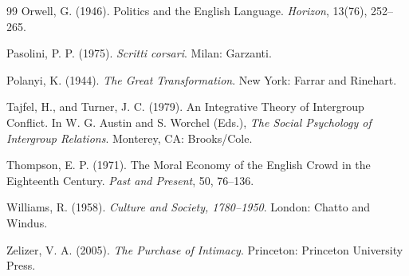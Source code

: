 \documentclass[12pt]{article}
\begin{document}
\begin{thebibliography}{99}
Orwell, G. (1946).
\newblock Politics and the English Language.
\newblock \emph{Horizon}, 13(76), 252--265.

Pasolini, P. P. (1975).
\newblock \emph{Scritti corsari}.
\newblock Milan: Garzanti.

Polanyi, K. (1944).
\newblock \emph{The Great Transformation}.
\newblock New York: Farrar and Rinehart.

Tajfel, H., and Turner, J. C. (1979).
\newblock An Integrative Theory of Intergroup Conflict.
\newblock In W. G. Austin and S. Worchel (Eds.), \emph{The Social Psychology of Intergroup Relations}. Monterey, CA: Brooks/Cole.

Thompson, E. P. (1971).
\newblock The Moral Economy of the English Crowd in the Eighteenth Century.
\newblock \emph{Past and Present}, 50, 76--136.

Williams, R. (1958).
\newblock \emph{Culture and Society, 1780--1950}.
\newblock London: Chatto and Windus.

Zelizer, V. A. (2005).
\newblock \emph{The Purchase of Intimacy}.
\newblock Princeton: Princeton University Press.

\end{thebibliography}
\end{document}
